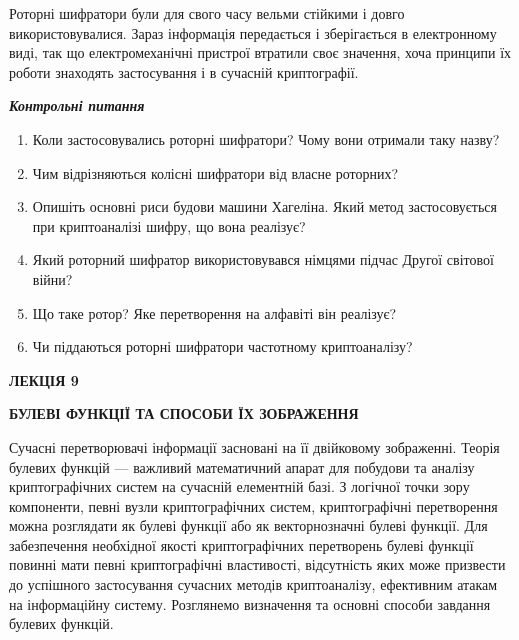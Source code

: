 {Роторні шифратори були для свого часу вельми стійкими і довго використовувалися.
Зараз інформація передається і зберігається в електронному виді, так що
електромеханічні пристрої втратили своє значення, хоча принципи їх роботи
знаходять застосування і в сучасній криптографії.


\bigskip

{\centering\bfseries\itshape
Контрольні питання
\par}


\bigskip


\bigskip

\liststyleWWviiiNumxxxiv
\begin{enumerate}
\item Коли застосовувались роторні шифратори? Чому вони отримали таку назву?
\item Чим відрізняються колісні шифратори від власне роторних?
\item Опишіть основні риси будови машини Хагеліна. Який метод застосовується при
криптоаналізі шифру, що вона реалізує?
\item Який роторний шифратор використовувався німцями підчас Другої світової
війни? 
\item Що таке ротор? Яке перетворення на алфавіті він реалізує?
\item Чи піддаються роторні шифратори частотному криптоаналізу?
\end{enumerate}

\bigskip


\bigskip


\bigskip

{\bfseries
 ЛЕКЦІЯ  9}


\bigskip

{\centering\bfseries
БУЛЕВІ  ФУНКЦІЇ  ТА  СПОСОБИ  ЇХ  ЗОБРАЖЕННЯ 
\par}


\bigskip


\bigskip

Сучасні перетворювачі інформації засновані на  її двійковому зображенні. Теорія
булевих функцій --- важливий математичний апарат для побудови та аналізу
криптографічних систем на сучасній елементній базі. З логічної точки зору
компоненти, певні вузли криптографічних систем, криптографічні перетворення
можна розглядати як булеві функції або як векторнозначні булеві функції. Для
забезпечення необхідної якості криптографічних перетворень булеві функції
повинні мати певні криптографічні властивості, відсутність яких може призвести
до успішного застосування сучасних методів криптоаналізу, ефективним атакам на
інформаційну систему. Розглянемо визначення та основні способи завдання булевих
функцій.


}
